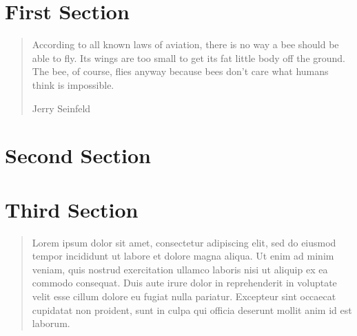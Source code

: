 \section{First Section}

\begin{quote}
According to all known laws of aviation, there is no way a bee should be able to fly.
Its wings are too small to get its fat little body off the ground.
The bee, of course, flies anyway because bees don't care what humans think is impossible.


\hfill{}Jerry Seinfeld
\end{quote}

\section{Second Section}


\section{Third Section}
\begin{quote}
Lorem ipsum dolor sit amet, consectetur adipiscing elit, sed do eiusmod tempor incididunt ut labore et dolore magna aliqua. Ut enim ad minim veniam, quis nostrud exercitation ullamco laboris nisi ut aliquip ex ea commodo consequat. Duis aute irure dolor in reprehenderit in voluptate velit esse cillum dolore eu fugiat nulla pariatur. Excepteur sint occaecat cupidatat non proident, sunt in culpa qui officia deserunt mollit anim id est laborum.

\hfill{}\cite{LoremIpsum2022}
\end{quote}
